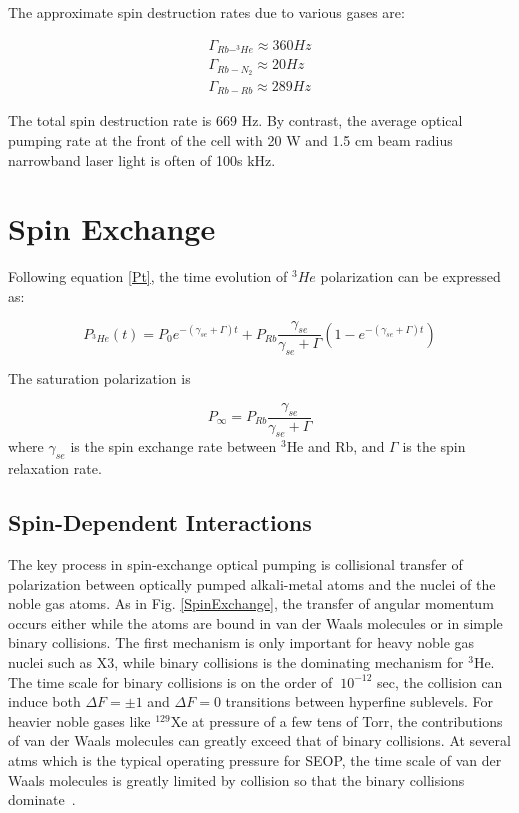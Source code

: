 The approximate spin destruction rates due to various gases are:

\begin{subequations}
	\begin{gather}
	\Gamma_{Rb-^{3}He} \approx 360Hz\\
	\Gamma_{Rb-N_{2}} \approx 20Hz\\
	\Gamma_{Rb-Rb} \approx 289Hz
	\end{gather}
\end{subequations}

The total spin destruction rate is 669 Hz. By contrast, the average optical pumping rate at the front of the cell with 20 W and 1.5 cm beam radius narrowband laser light is often of 100s kHz.  

\section{Spin Exchange}

Following equation \ref{Pt}, the time evolution of $^{3}He$ polarization can be expressed as:

\begin{equation}
P_{^{3}He}(t) = P_{0}e^{-(\gamma_{se}+\Gamma)t} + P_{Rb} \frac{\gamma_{se}}{\gamma_{se}+\Gamma}(1-e^{-(\gamma_{se}+\Gamma)t})
\end{equation}

The saturation polarization is 

\begin{equation}
P_{\infty} = P_{Rb}\frac{\gamma_{se}}{\gamma_{se}+\Gamma}
\end{equation}
where $\gamma_{se}$ is the spin exchange rate between $^{3}$He and Rb, and $\Gamma$ is the spin relaxation rate. 

\subsection{Spin-Dependent Interactions}

The key process in spin-exchange optical pumping is collisional transfer of polarization between optically pumped alkali-metal atoms and the nuclei of the noble gas atoms. As in Fig. \ref{SpinExchange}, the transfer of angular momentum occurs either while the atoms are bound in van der Waals molecules or in simple binary collisions. The first mechanism is only important for heavy noble gas nuclei such as X3, while binary collisions is the dominating mechanism for $^{3}$He. The time scale for binary collisions is on the order of $~10^{-12}$ sec, the collision can induce both $\Delta F=\pm1$ and $\Delta F=0$ transitions between hyperfine sublevels. For heavier noble gases like $^{129}$Xe at pressure of a few tens of Torr, the contributions of van der Waals molecules can greatly exceed that of binary collisions. At several atms which is the typical operating pressure for SEOP, the time scale of van der Waals molecules is greatly limited by collision so that the binary collisions dominate~\cite{WalkerHapper}.

